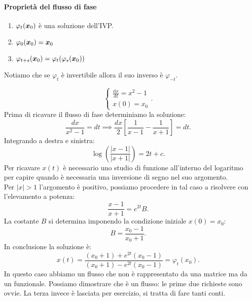 \paragraph{Proprietà del flusso di fase}%
\label{par:Proprietà del flusso di fase}
\begin{enumerate}
    \item $\varphi_t(\boldsymbol{x}_0)$ è una soluzione dell'IVP.
    \item $\varphi_0(\boldsymbol{x}_0) = \boldsymbol{x}_0$ 
    \item $\varphi_{t+s}(\boldsymbol{x}_0)=\varphi_t(\varphi_s(\boldsymbol{x}_0))$ 
\end{enumerate}
Notiamo che se $\varphi_t$  è invertibile allora il suo inverso è $\varphi_{-t}$.  
\begin{exmp}
    \[
        \begin{cases}
            \frac{\text{d} x}{\text{d} t} = x^2-1\\
	    x(0) = x_0
        \end{cases}
    .\] 
    Prima di ricavare il flusso di fase determiniamo la soluzione:
    \[
        \frac{dx}{x^2-1} = dt \implies  \frac{dx}{2} \left[\frac{1}{x-1}-\frac{1}{x+1}\right] = dt
    .\] 
    Integrando a destra e sinistra:
    \[
	\log (\frac{\left|x-1\right|}{\left|x+1\right|}) = 2t + c
    .\] 
    Per ricavare $x(t)$  è necessario uno studio di funzione all'interno del logaritmo per capire quando è necessaria una inversione di segno nel suo argomento.\\
    Per $\left|x\right| > 1$  l'argomento è positivo, possiamo procedere in tal caso a risolvere con l'elevamento a potenza:
    \[
        \frac{x-1}{x+1}=e^{2t}B
    .\] 
    La costante $B$  si determina imponendo la condizione iniziale $x(0)=x_0$:
    \[
        B=\frac{x_0-1}{x_0+1}
    .\] 
    In conclusione la soluzione è:
    \[
	x(t) = \frac{(x_0+1)+e^{2t}(x_0-1)}{(x_0+1) -e^{2t}(x_0-1)} = \varphi_t(x_0)
    .\] 
    In questo caso abbiamo un flusso che non è rappresentato da una matrice ma da un funzionale. Possiamo dimostrare che è un flusso: le prime due richieste sono ovvie. La terza invece è lasciata per esercizio, si tratta di fare tanti conti.
\end{exmp}
